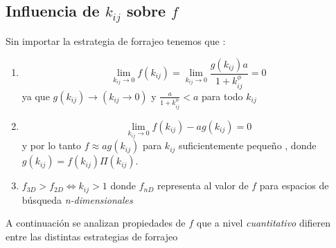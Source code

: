 \subsection{Influencia de $k_{ij}$ sobre $f$}

Sin importar la estrategia de forrajeo tenemos que :
\begin{enumerate}[label=(\alph*)]
\item \begin{equation}
  \lim_{k_{ij} \to  0 }f(k_{ij}) = \lim_{k_{ij} \to 0 }\frac{g(k_{ij}) a}{1+k_{ij}^\phi} = 0 
\end{equation}
ya que $ g(k_{ij}) \to (k_{ij} \to 0)$ y $\frac{a}{1+k_{ij}^\phi} < a$  para todo $k_{ij}$
\item 
\begin{equation}
\lim_{k_{ij} \to  0 }f(k_{ij}) - ag(k_{ij}) = 0
\end{equation}
y por lo tanto $f \approx a g(k_{ij})$ para $k_{ij}$ suficientemente peque\~no , donde $g(k_{ij}) = f(k_{ij})\Pi(k_{ij})$.
\item $f_{3D} > f_{2D} \iff k_{ij} > 1$ donde $f_{nD}$ representa al valor de $f$ para espacios de b\'usqueda \emph{n-dimensionales}
\end{enumerate}

A continuaci\'on se analizan propiedades de $f$ que a nivel \emph{cuantitativo} difieren entre las distintas estrategias de forrajeo





